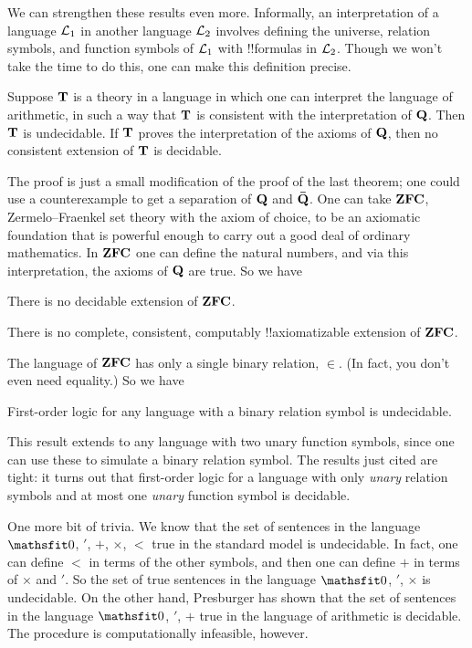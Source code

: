 \documentclass[../../../include/open-logic-section]{subfiles}
\begin{document}


We can strengthen these results even more. Informally, an
interpretation of a language $\Lang{L_1}$ in another language
$\Lang{L_2}$ involves defining the universe, relation symbols, and
function symbols of $\Lang{L_1}$ with !!{formula}s in
$\Lang{L_2}$. Though we won't take the time to do this, one can make
this definition precise.

\begin{thm}
  Suppose $\mathbf{T}$ is a theory in a language in which one can
  interpret the language of arithmetic, in such a way that $\mathbf{T}$ is
  consistent with the interpretation of $\mathbf{Q}$. Then $\mathbf{T}$ is
  undecidable. If $\mathbf{T}$ proves the interpretation of the axioms of
  $\mathbf{Q}$, then no consistent extension of $\mathbf{T}$ is decidable.
\end{thm}

The proof is just a small modification of the proof of the last
theorem; one could use a counterexample to get a separation of $\mathbf{Q}$ and
$\mathbf{\bar Q}$. One can take $\mathbf{ZFC}$, Zermelo--Fraenkel set theory with the
axiom of choice, to be an axiomatic foundation that is powerful enough
to carry out a good deal of ordinary mathematics. In $\mathbf{ZFC}$ one
can define the natural numbers, and via this interpretation, the
axioms of $\mathbf{Q}$ are true. So we have

\begin{cor}
There is no decidable extension of $\mathbf{ZFC}$.
\end{cor}

\begin{cor}
There is no complete, consistent, computably !!{axiomatizable} extension of
$\mathbf{ZFC}$. 
\end{cor}

The language of $\mathbf{ZFC}$ has only a single binary relation,
$\in$. (In fact, you don't even need equality.) So we have

\begin{cor}
First-order logic for any language with a binary relation symbol is
undecidable.
\end{cor}

This result extends to any language with two unary function symbols,
since one can use these to simulate a binary relation symbol. The
results just cited are tight: it turns out that first-order logic for
a language with only \emph{unary} relation symbols and at most one
\emph{unary} function symbol is decidable.

One more bit of trivia. We know that the set of sentences in the
language $\Obj 0$, $'$, $+$, $\times$, $<$ true in the standard model
is undecidable. In fact, one can define $<$ in terms of the other
symbols, and then one can define $+$ in terms of $\times$ and $'$. So
the set of true sentences in the language $\Obj 0$, $'$, $\times$ is
undecidable. On the other hand, Presburger has shown that the set of
sentences in the language $\Obj 0$, $'$, $+$ true in the language of
arithmetic is decidable. The procedure is computationally infeasible,
however.
\end{document}
